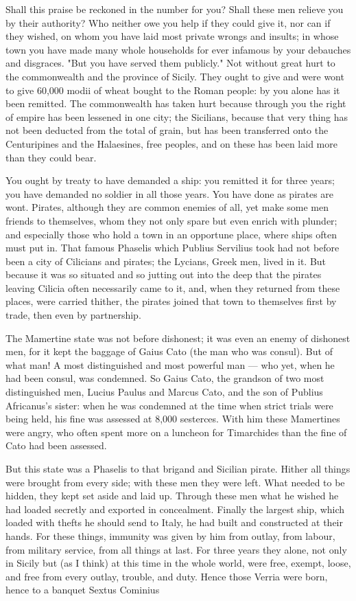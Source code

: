  Shall this praise be reckoned in the number for you? Shall these men relieve you by their authority? Who neither owe you help if they could give it, nor can if they wished, on whom you have laid most private wrongs and insults; in whose town you have made many whole households for ever infamous by your debauches and disgraces. "But you have served them publicly." Not without great hurt to the commonwealth and the province of Sicily. They ought to give and were wont to give 60,000 modii of wheat bought to the Roman people: by you alone has it been remitted. The commonwealth has taken hurt because through you the right of empire has been lessened in one city; the Sicilians, because that very thing has not been deducted from the total of grain, but has been transferred onto the Centuripines and the Halaesines, free peoples, and on these has been laid more than they could bear.

 You ought by treaty to have demanded a ship: you remitted it for three years; you have demanded no soldier in all those years. You have done as pirates are wont. Pirates, although they are common enemies of all, yet make some men friends to themselves, whom they not only spare but even enrich with plunder; and especially those who hold a town in an opportune place, where ships often must put in. That famous Phaselis which Publius Servilius took had not before been a city of Cilicians and pirates; the Lycians, Greek men, lived in it. But because it was so situated and so jutting out into the deep that the pirates leaving Cilicia often necessarily came to it, and, when they returned from these places, were carried thither, the pirates joined that town to themselves first by trade, then even by partnership.

 The Mamertine state was not before dishonest; it was even an enemy of dishonest men, for it kept the baggage of Gaius Cato (the man who was consul). But of what man! A most distinguished and most powerful man --- who yet, when he had been consul, was condemned. So Gaius Cato, the grandson of two most distinguished men, Lucius Paulus and Marcus Cato, and the son of Publius Africanus's sister: when he was condemned at the time when strict trials were being held, his fine was assessed at 8,000 sesterces. With him these Mamertines were angry, who often spent more on a luncheon for Timarchides than the fine of Cato had been assessed.

 But this state was a Phaselis to that brigand and Sicilian pirate. Hither all things were brought from every side; with these men they were left. What needed to be hidden, they kept set aside and laid up. Through these men what he wished he had loaded secretly and exported in concealment. Finally the largest ship, which loaded with thefts he should send to Italy, he had built and constructed at their hands. For these things, immunity was given by him from outlay, from labour, from military service, from all things at last. For three years they alone, not only in Sicily but (as I think) at this time in the whole world, were free, exempt, loose, and free from every outlay, trouble, and duty. Hence those Verria were born, hence to a banquet Sextus Cominius


